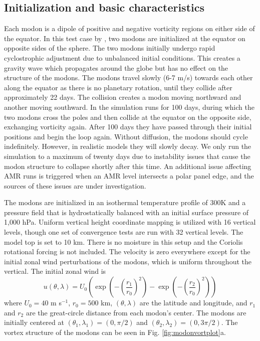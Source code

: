 \subsection{Initialization and basic characteristics}
Each modon is a dipole of positive and negative vorticity regions on either side of the equator.
In this test case by \cite{lin2017colliding}, two modons are initialized at the equator on opposite sides
of the sphere. The two modons initially undergo rapid cyclostrophic adjustment due to 
unbalanced initial conditions.  This creates a gravity wave which propagates 
around the globe but has no effect on the structure of the modons.
The modons travel slowly (6-7 m/s) towards each other along the equator as 
there is no planetary rotation, until they collide after approximately 22 days. 
The collision creates a modon moving northward and another moving southward. In 
\cite{lin2017colliding} the simulation runs for 100 days,
during which the two modons cross the poles and then collide at the equator on the opposite side, 
exchanging vorticity again. After 100 days they have passed through their initial positions 
and begin the loop again. Without diffusion, the modons should cycle indefinitely. 
However, in realistic models they will slowly decay.  We only run the simulation  
to a maximum of twenty days due to instability issues that cause the modon structure to collapse 
shortly after this time. An additional issue affecting AMR runs is triggered when an 
AMR level intersects a polar panel edge, and the sources of these issues are under investigation.

The modons are initialized in an isothermal temperature profile of $300$K and a pressure 
field that is hydrostatically balanced with an initial surface pressure of 1,000 hPa. 
Uniform vertical height coordinate mapping is utilized with 16 vertical levels, though 
one set of convergence tests are run with 32 vertical levels. 
The model top is set to 10 km.  
There is no moisture in this setup and the Coriolis rotational forcing is not included.
The velocity is zero everywhere except for the initial zonal
wind perturbations of the modons, which is uniform throughout the vertical. The initial zonal wind is
\begin{equation}
\label{eq:modonwind}
  u(\theta,\lambda) =  U_0 \left(\exp{\left(-\left(\frac{r_1}{r_0}\right)^2\right)} - \exp {\left(-\left(\frac{r_2}{r_0}\right)^2\right)}\right)
\end{equation}
where $U_0=40$ m s$^{-1}$, $r_0 =500$ km, $(\theta,\lambda)$ are the latitude and longitude, and $r_1$ and $r_2$ are the
great-circle distance from each modon's center. The modons are initially centered at $(\theta_1,\lambda_1) = (0,\pi/2)$ and
$(\theta_2,\lambda_2) = (0,3\pi/2)$. The vortex structure of the modons can be seen in Fig. \ref{fig:modonvortplot}a.  

